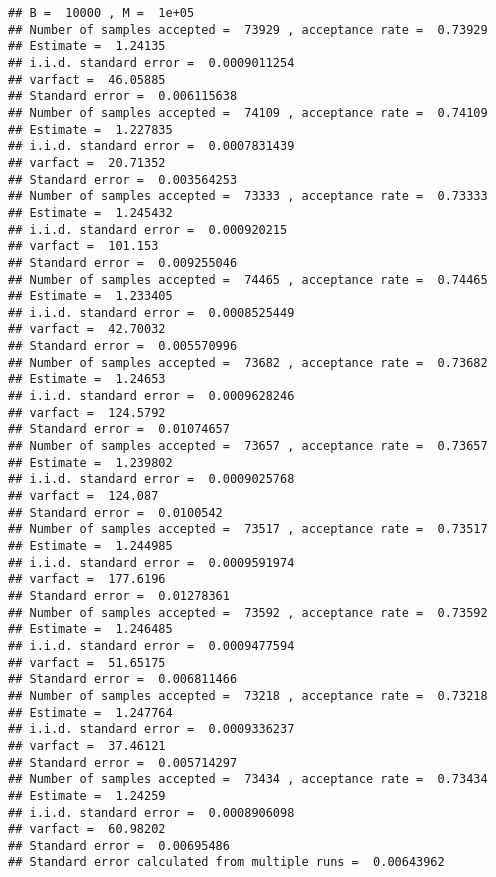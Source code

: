 \begin{knitrout}
\color{fgcolor}\begin{kframe}
\begin{verbatim}
## B =  10000 , M =  1e+05
## Number of samples accepted =  73929 , acceptance rate =  0.73929 
## Estimate =  1.24135 
## i.i.d. standard error =  0.0009011254 
## varfact =  46.05885 
## Standard error =  0.006115638 
## Number of samples accepted =  74109 , acceptance rate =  0.74109 
## Estimate =  1.227835 
## i.i.d. standard error =  0.0007831439 
## varfact =  20.71352 
## Standard error =  0.003564253 
## Number of samples accepted =  73333 , acceptance rate =  0.73333 
## Estimate =  1.245432 
## i.i.d. standard error =  0.000920215 
## varfact =  101.153 
## Standard error =  0.009255046 
## Number of samples accepted =  74465 , acceptance rate =  0.74465 
## Estimate =  1.233405 
## i.i.d. standard error =  0.0008525449 
## varfact =  42.70032 
## Standard error =  0.005570996 
## Number of samples accepted =  73682 , acceptance rate =  0.73682 
## Estimate =  1.24653 
## i.i.d. standard error =  0.0009628246 
## varfact =  124.5792 
## Standard error =  0.01074657 
## Number of samples accepted =  73657 , acceptance rate =  0.73657 
## Estimate =  1.239802 
## i.i.d. standard error =  0.0009025768 
## varfact =  124.087 
## Standard error =  0.0100542 
## Number of samples accepted =  73517 , acceptance rate =  0.73517 
## Estimate =  1.244985 
## i.i.d. standard error =  0.0009591974 
## varfact =  177.6196 
## Standard error =  0.01278361 
## Number of samples accepted =  73592 , acceptance rate =  0.73592 
## Estimate =  1.246485 
## i.i.d. standard error =  0.0009477594 
## varfact =  51.65175 
## Standard error =  0.006811466 
## Number of samples accepted =  73218 , acceptance rate =  0.73218 
## Estimate =  1.247764 
## i.i.d. standard error =  0.0009336237 
## varfact =  37.46121 
## Standard error =  0.005714297 
## Number of samples accepted =  73434 , acceptance rate =  0.73434 
## Estimate =  1.24259 
## i.i.d. standard error =  0.0008906098 
## varfact =  60.98202 
## Standard error =  0.00695486
## Standard error calculated from multiple runs =  0.00643962
\end{verbatim}
\end{kframe}
\end{knitrout}


